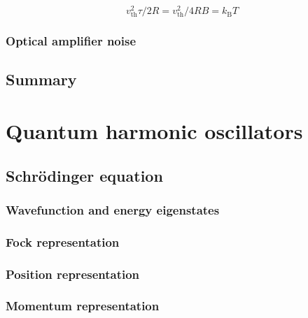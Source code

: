 \documentclass{book}
\begin{document}
\begin{equation}
v_\mathrm{th}^2\tau/2R = v_\mathrm{th}^2 / 4RB = k_\mathrm{B}T
\end{equation}


\subsection{Optical amplifier noise}
\section{Summary}

\chapter{Quantum harmonic oscillators}
\section{Schr\"odinger equation}
\subsection{Wavefunction and energy eigenstates}
\subsection{Fock representation}
\subsection{Position representation}
\subsection{Momentum representation}
\end{document}
